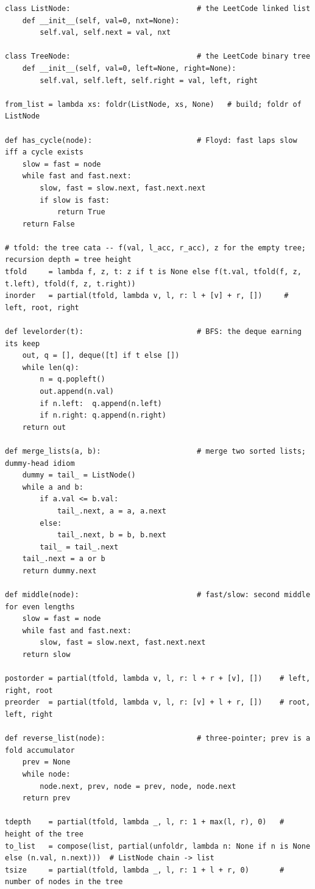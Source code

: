 \documentclass[11pt,letterpaper]{book}
\begin{document}
\begin{lstlisting}[style=file]
class ListNode:                             # the LeetCode linked list
    def __init__(self, val=0, nxt=None):
        self.val, self.next = val, nxt

class TreeNode:                             # the LeetCode binary tree
    def __init__(self, val=0, left=None, right=None):
        self.val, self.left, self.right = val, left, right

from_list = lambda xs: foldr(ListNode, xs, None)   # build; foldr of ListNode

def has_cycle(node):                        # Floyd: fast laps slow iff a cycle exists
    slow = fast = node
    while fast and fast.next:
        slow, fast = slow.next, fast.next.next
        if slow is fast:
            return True
    return False

# tfold: the tree cata -- f(val, l_acc, r_acc), z for the empty tree; recursion depth = tree height
tfold     = lambda f, z, t: z if t is None else f(t.val, tfold(f, z, t.left), tfold(f, z, t.right))
inorder   = partial(tfold, lambda v, l, r: l + [v] + r, [])     # left, root, right

def levelorder(t):                          # BFS: the deque earning its keep
    out, q = [], deque([t] if t else [])
    while len(q):
        n = q.popleft()
        out.append(n.val)
        if n.left:  q.append(n.left)
        if n.right: q.append(n.right)
    return out

def merge_lists(a, b):                      # merge two sorted lists; dummy-head idiom
    dummy = tail_ = ListNode()
    while a and b:
        if a.val <= b.val:
            tail_.next, a = a, a.next
        else:
            tail_.next, b = b, b.next
        tail_ = tail_.next
    tail_.next = a or b
    return dummy.next

def middle(node):                           # fast/slow: second middle for even lengths
    slow = fast = node
    while fast and fast.next:
        slow, fast = slow.next, fast.next.next
    return slow

postorder = partial(tfold, lambda v, l, r: l + r + [v], [])    # left, right, root
preorder  = partial(tfold, lambda v, l, r: [v] + l + r, [])    # root, left, right

def reverse_list(node):                     # three-pointer; prev is a fold accumulator
    prev = None
    while node:
        node.next, prev, node = prev, node, node.next
    return prev

tdepth    = partial(tfold, lambda _, l, r: 1 + max(l, r), 0)   # height of the tree
to_list   = compose(list, partial(unfoldr, lambda n: None if n is None else (n.val, n.next)))  # ListNode chain -> list
tsize     = partial(tfold, lambda _, l, r: 1 + l + r, 0)       # number of nodes in the tree


\end{lstlisting}
\end{document}
